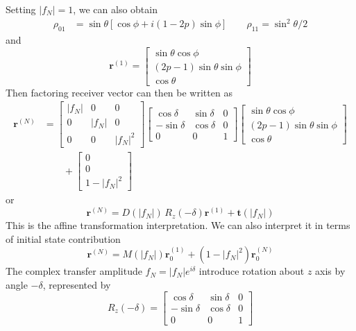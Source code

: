 \documentclass[../../../main.tex]{subfiles}
\begin{document}
Setting $|f_N|=1$, we can also obtain
\begin{align*}
  \rho_{01} & =  \sin \theta [\cos \phi + i(1-2p)\sin \phi]\qquad
  \rho_{11} = \sin ^2\theta/2
\end{align*}
and
\begin{equation*}
  \mathbf r^{(1)} =
  \begin{bmatrix} \sin\theta\cos\phi\\ (2p-1)\sin\theta\sin\phi\\ \cos\theta \end{bmatrix}
\end{equation*}
Then factoring receiver vector can then be written as
\begin{align*}
  \mathbf r^{(N)} & =
  \begin{bmatrix} |f_N|&0&0\\ 0&|f_N|&0\\ 0&0&|f_N|^2 \end{bmatrix}
  \begin{bmatrix}
    \cos\delta  & \sin\delta & 0 \\
    -\sin\delta & \cos\delta & 0 \\
    0           & 0          & 1
  \end{bmatrix}
  \begin{bmatrix} \sin\theta\cos\phi\\ (2p-1)\sin\theta\sin\phi\\ \cos\theta \end{bmatrix} \\
                  & \qquad+ \begin{bmatrix} 0\\ 0\\ 1-|f_N|^2 \end{bmatrix}
\end{align*}
or
\begin{equation*}
  \mathbf r^{(N)}  =  D(|f_N|)\,R_z(-\delta) \mathbf r^{(1)} +\mathbf t(|f_N|)
\end{equation*}
This is the affine transformation interpretation.
We can also interpret it in terms of initial state contribution
\begin{equation*}
  \mathbf r^{(N)}  =  M(|f_N|) \mathbf r^{(1)}_0 +(1-|f_N|^2)\mathbf r^{(N)}_0
\end{equation*}
The complex transfer amplitude $f_N = |f_N|e^{i\delta}$ introduce rotation about $z$ axis by angle $-\delta$, represented by
\begin{equation*}
  R_z (-\delta) =
  \begin{bmatrix}
    \cos\delta  & \sin\delta & 0 \\
    -\sin\delta & \cos\delta & 0 \\
    0           & 0          & 1
  \end{bmatrix}
\end{equation*}
\end{document}
